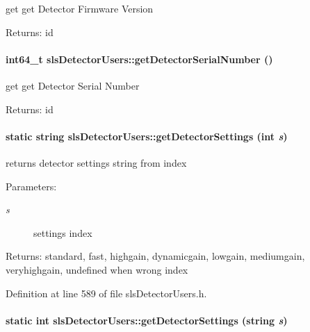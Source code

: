 get get Detector Firmware Version \begin{Desc}
\item[Returns:]id \end{Desc}
\hypertarget{classslsDetectorUsers_1c79314ceeda9b3085ca118e25882669}{
\paragraph[getDetectorSerialNumber]{\setlength{\rightskip}{0pt plus 5cm}int64\_\-t sls\-Detector\-Users::get\-Detector\-Serial\-Number ()}\hfill}
\label{classslsDetectorUsers_1c79314ceeda9b3085ca118e25882669}


get get Detector Serial Number \begin{Desc}
\item[Returns:]id \end{Desc}
\hypertarget{classslsDetectorUsers_a66defec09b568a514e57b444dbe0d7f}{
\paragraph[getDetectorSettings]{\setlength{\rightskip}{0pt plus 5cm}static string sls\-Detector\-Users::get\-Detector\-Settings (int {\em s})}\hfill}
\label{classslsDetectorUsers_a66defec09b568a514e57b444dbe0d7f}


returns detector settings string from index 

\begin{Desc}
\item[Parameters:]
\begin{description}
\item[{\em s}]settings index \end{description}
\end{Desc}
\begin{Desc}
\item[Returns:]standard, fast, highgain, dynamicgain, lowgain, mediumgain, veryhighgain, undefined when wrong index \end{Desc}


Definition at line 589 of file sls\-Detector\-Users.h.\hypertarget{classslsDetectorUsers_7f2e97b2fa0e106b364c9c200a5d74ad}{
\paragraph[getDetectorSettings]{\setlength{\rightskip}{0pt plus 5cm}static int sls\-Detector\-Users::get\-Detector\-Settings (string {\em s})}\hfill}
\label{classslsDetectorUsers_7f2e97b2fa0e106b364c9c200a5d74ad}



